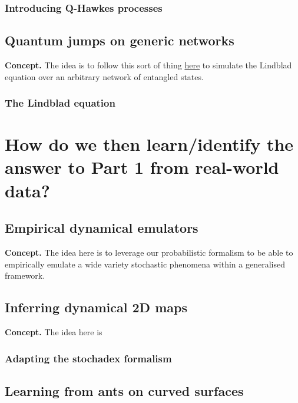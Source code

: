 \documentclass{book}
\begin{document}
\section{\sffamily Introducing Q-Hawkes processes}


\chapter{\sffamily Quantum jumps on generic networks}

{\bfseries\sffamily Concept.} The idea is to follow this sort of thing \href{https://en.wikipedia.org/wiki/Quantum_jump_method}{here} to simulate the Lindblad equation over an arbitrary network of entangled states.

\section{\sffamily The Lindblad equation}


\part*{{ How do we then learn/identify the answer to Part 1 from real-world data?}}

\chapter{\sffamily Empirical dynamical emulators}

{\bfseries\sffamily Concept.} The idea here is to leverage our probabilistic formalism to be able to empirically emulate a wide variety stochastic phenomena within a generalised framework.


\chapter{\sffamily Inferring dynamical 2D maps}

{\bfseries\sffamily Concept.} The idea here is 


\section{\sffamily Adapting the stochadex formalism}

\chapter{\sffamily Learning from ants on curved surfaces}
\end{document}

